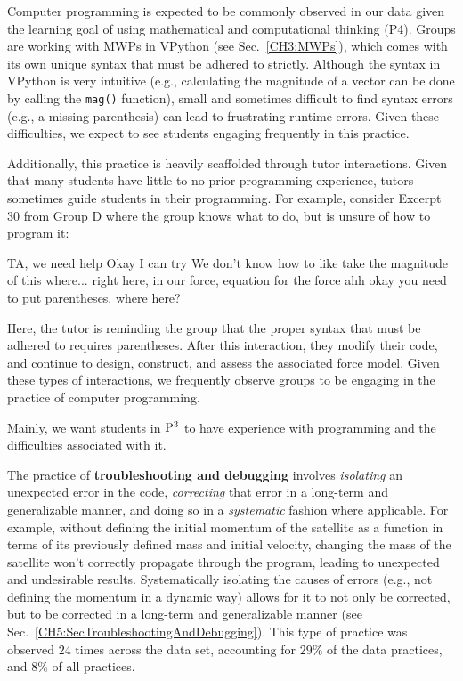 \documentclass{msuphddissertation}
\begin{document}
\begin{doublespace}
Computer programming is expected to be commonly observed in our data given the learning goal of using mathematical and computational thinking (P4).  Groups are working with MWPs in VPython (see Sec.~\ref{CH3:MWPs}), which comes with its own unique syntax that must be adhered to strictly.  Although the syntax in VPython is very intuitive (e.g., calculating the magnitude of a vector can be done by calling the \texttt{mag()} function), small and sometimes difficult to find syntax errors (e.g., a missing parenthesis) can lead to frustrating runtime errors.  Given these difficulties, we expect to see students engaging frequently in this practice.

Additionally, this practice is heavily scaffolded through tutor interactions.  Given that many students have little to no prior programming experience, tutors sometimes guide students in their programming.  For example, consider Excerpt 30 from Group D where the group knows what to do, but is unsure of how to program it: \begin{description}
\SB TA, we need help
\TA Okay I can try
\SB We don't know how to like take the magnitude of this
\TA where...
\SB right here, in our force, equation for the force
\TA ahh okay you need to put parentheses.
\SB where here?
\end{description}  Here, the tutor is reminding the group that the proper syntax that must be adhered to requires parentheses.  After this interaction, they modify their code, and continue to design, construct, and assess the associated force model.  Given these types of interactions, we frequently observe groups to be engaging in the practice of computer programming.

Mainly, we want students in ${\rm P}^{3}$ to have experience with programming and the difficulties associated with it.

%
%
%

The practice of \textbf{troubleshooting and debugging} involves \textit{isolating} an unexpected error in the code, \textit{correcting} that error in a long-term and generalizable manner, and doing so in a \textit{systematic} fashion where applicable.  For example, without defining the initial momentum of the satellite as a function in terms of its previously defined mass and initial velocity, changing the mass of the satellite won't correctly propagate through the program, leading to unexpected and undesirable results.  Systematically isolating the causes of errors (e.g., not defining the momentum in a dynamic way) allows for it to not only be corrected, but to be corrected in a long-term and generalizable manner (see Sec.~\ref{CH5:SecTroubleshootingAndDebugging}).  This type of practice was observed $24$ times across the data set, accounting for $29\%$ of the data practices, and $8\%$ of all practices.


\end{doublespace}
\end{document}
